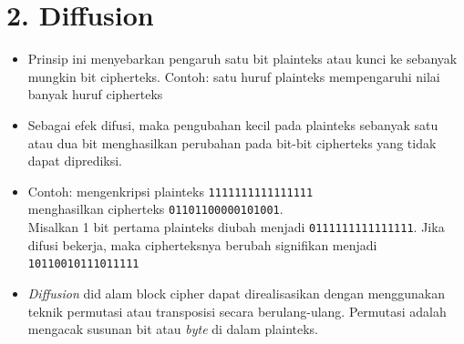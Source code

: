 \documentclass{article}
\begin{document}

\section*{2. Diffusion}

\begin{itemize}
    \item Prinsip ini menyebarkan pengaruh satu bit plainteks atau kunci ke sebanyak mungkin bit cipherteks.
    Contoh: satu huruf plainteks mempengaruhi nilai banyak huruf cipherteks
    
    \item Sebagai efek difusi, maka pengubahan kecil pada plainteks sebanyak satu atau dua bit menghasilkan perubahan pada bit-bit cipherteks yang tidak dapat diprediksi.
    
    \item Contoh: mengenkripsi plainteks \texttt{1111111111111111} \\ 
    menghasilkan cipherteks \texttt{01101100000101001}. \\ 
    Misalkan 1 bit pertama plainteks diubah menjadi \texttt{0111111111111111}. Jika difusi bekerja, maka cipherteksnya berubah signifikan menjadi \texttt{10110010111011111}
    
    \item \textit{Diffusion} did alam block cipher dapat direalisasikan dengan menggunakan teknik permutasi atau transposisi secara berulang-ulang. Permutasi adalah mengacak susunan bit atau \textit{byte} di dalam plainteks.
\end{itemize}
\end{document}
